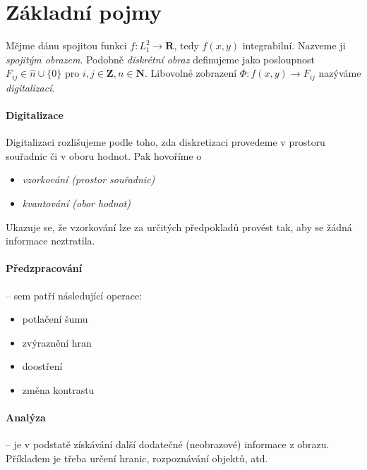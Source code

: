 \def\R{\mathbf{R}}
\def\N{\mathbf{N}}
\def\L{\mathbf{L}}
\def\Z{\mathbf{Z}}

\def\bcirc{\mathbin{\mathpalette\makebcirc{\circ}}} 
\def\bast{\mathbin{\mathpalette\makebcirc{\ast}}}
\def\msurr{\mathsurround=0pt}
\def\makebcirc#1#2{%
  \ooalign{$#1\bigcirc\msurr$\cr \hfil$#1#2\msurr$\hfil}}

\def\corr{\bast}
\def\conv{\ast}

\section{Základní pojmy}

Mějme dánu spojitou funkci $f:L_1^2\rightarrow \R$, tedy $f(x,y)$ integrabilní. Nazveme ji \emph{spojitým obrazem}.
Podobně \emph{diskrétní obraz} definujeme jako posloupnost $F_{ij}\in \hat{n}\cup \{0\}$ pro $i,j\in\Z,n\in\N$.
Libovolné zobrazení $\Phi: f(x,y)\rightarrow F_{ij}$ nazýváme \emph{digitalizací}.



\paragraph{Digitalizace}
Digitalizaci rozlišujeme podle toho, zda diskretizaci provedeme v prostoru souřadnic či v oboru hodnot. Pak hovoříme o
\begin{itemize}
\item \emph{vzorkování (prostor souřadnic)}
\item \emph{kvantování (obor hodnot)}
\end{itemize}
Ukazuje se, že vzorkování lze za určitých předpokladů provést tak, aby se žádná informace neztratila.
 
\paragraph{Předzpracování} -- sem patří následující operace:
\begin{itemize}
\item potlačení šumu
\item zvýraznění hran
\item doostření
\item změna kontrastu
\end{itemize}

\paragraph{Analýza} -- je v podstatě získávání další dodatečné (neobrazové) informace z obrazu. Příkladem je třeba
určení hranic, rozpoznávání objektů, atd.

